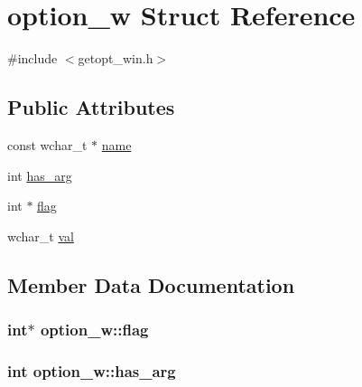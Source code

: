 \hypertarget{structoption__w}{}\section{option\+\_\+w Struct Reference}
\label{structoption__w}


{\ttfamily \#include $<$getopt\+\_\+win.\+h$>$}

\subsection*{Public Attributes}
\begin{DoxyCompactItemize}
\item 
const wchar\+\_\+t $\ast$ \hyperlink{structoption__w_a68997974643a31ca2106c35785143411}{name}
\item 
int \hyperlink{structoption__w_af7a72653a7b69f7d1d0e7dac3fe8d270}{has\+\_\+arg}
\item 
int $\ast$ \hyperlink{structoption__w_a55a1112c235328c50fb0d8516f727d8d}{flag}
\item 
wchar\+\_\+t \hyperlink{structoption__w_a0613f2e095c1918d8d9f9ace871db1f9}{val}
\end{DoxyCompactItemize}


\subsection{Member Data Documentation}
\hypertarget{structoption__w_a55a1112c235328c50fb0d8516f727d8d}{}
\subsubsection[{flag}]{\setlength{\rightskip}{0pt plus 5cm}int$\ast$ option\+\_\+w\+::flag}\label{structoption__w_a55a1112c235328c50fb0d8516f727d8d}
\hypertarget{structoption__w_af7a72653a7b69f7d1d0e7dac3fe8d270}{}
\subsubsection[{has\+\_\+arg}]{\setlength{\rightskip}{0pt plus 5cm}int option\+\_\+w\+::has\+\_\+arg}\label{structoption__w_af7a72653a7b69f7d1d0e7dac3fe8d270}
\hypertarget{structoption__w_a68997974643a31ca2106c35785143411}{}
